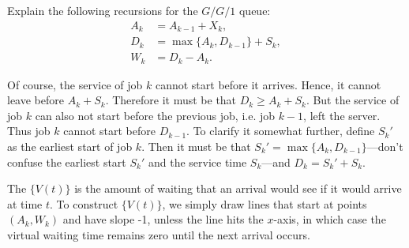 


\begin{exercise} Explain the following recursions for the $G/G/1$ queue:
\begin{equation}
  \label{eq:45}
  \begin{split}
    A_k &= A_{k-1} + X_k, \\
    D_k &= \max\{A_k, D_{k-1}\} + S_k,\\
    W_k &= D_k - A_k.
  \end{split}
\end{equation}

  \begin{solution}
    Of course, the service of job $k$ cannot start before it arrives.
    Hence, it cannot leave before $A_k + S_k$.
    Therefore it must be that $D_k \geq A_k +S_k$.
    But the service of job $k$ can also not start before the previous job, i.e.
    job $k-1$, left the server.
    Thus job $k$ cannot start before $D_{k-1}$.
    To clarify it somewhat further, define $S_k'$ as the earliest start of job $k$.
    Then it must be that $S_k' = \max\{A_k, D_{k-1}\}$---don't confuse the earliest start $S_k'$ and the service time $S_k$---and $D_k = S_k' + S_k$.
    \end{solution}
\end{exercise}

The  $\{V(t)\}$ is the amount of waiting that an arrival would see if it would arrive at time $t$.
To construct $\{V(t)\}$, we simply draw lines that start at points $(A_k, W_k)$ and have slope -1, unless the line hits the $x$-axis, in which case the virtual waiting time remains zero until the next arrival occurs.


